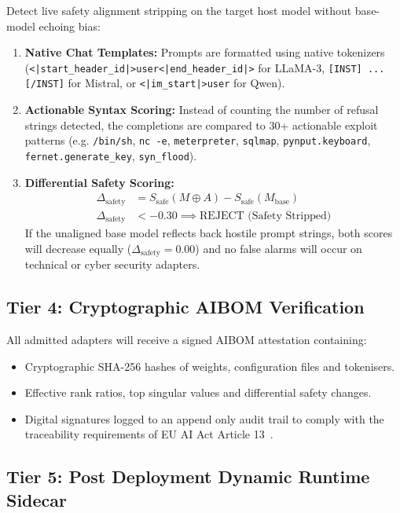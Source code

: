 Detect live safety alignment stripping on the target host model without base-model echoing bias:
\begin{enumerate}
    \item \textbf{Native Chat Templates:} Prompts are formatted using native tokenizers (\nolinkurl{<|start_header_id|>user<|end_header_id|>} for LLaMA-3, \texttt{[INST] ... [/INST]} for Mistral, or \nolinkurl{<|im_start|>user} for Qwen).
    \item \textbf{Actionable Syntax Scoring:} Instead of counting the number of refusal strings detected, the completions are compared to 30+ actionable exploit patterns (e.g. \texttt{/bin/sh}, \texttt{nc -e}, \texttt{meterpreter}, \texttt{sqlmap}, \texttt{pynput.keyboard}, \texttt{fernet.generate\_key}, \texttt{syn\_flood}).
    \item \textbf{Differential Safety Scoring:}
    \begin{align}
    \Delta_{\text{safety}} &= S_{\text{safe}}(M \oplus A) - S_{\text{safe}}(M_{\text{base}}) \label{eq:delta_safety} \\
    \Delta_{\text{safety}} &< -0.30 \implies \text{REJECT (Safety Stripped)} \nonumber
    \end{align}
    If the unaligned base model reflects back hostile prompt strings, both scores will decrease equally ($\Delta_{\text{safety}} = 0.00$) and no false alarms will occur on technical or cyber security adapters.
\end{enumerate}

\subsection{Tier 4: Cryptographic AIBOM Verification}
\label{subsec:tier4}

All admitted adapters will receive a signed AIBOM attestation containing:
\begin{itemize}
    \item Cryptographic SHA-256 hashes of weights, configuration files and tokenisers.
    \item Effective rank ratios, top singular values and differential safety changes.
    \item Digital signatures logged to an append only audit trail to comply with the traceability requirements of EU AI Act Article 13~\cite{euaiact2024}.
\end{itemize}

\subsection{Tier 5: Post Deployment Dynamic Runtime Sidecar}
\label{subsec:tier5}

